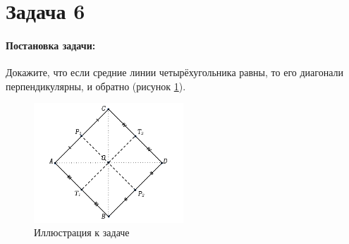 {
   \section*{Задача 6}
   \paragraph{Постановка задачи:}
   Докажите, что если средние линии четырёхугольника равны,
   то его диагонали перпендикулярны, и обратно (рисунок \ref{t6:im}).
   \begin{figure}[h]
      \centering
      \includegraphics[width=0.5\textwidth]{images/task6.pdf}
      \caption{Иллюстрация к задаче}
      \label{t6:im}
   \end{figure}
}
